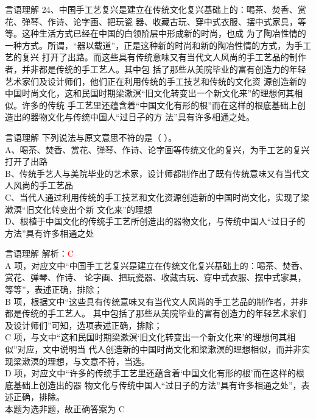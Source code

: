 \documentclass[aspectratio=169]{beamer}
\begin{document}
\begin{frame}[t]{言语理解}
24、中国手工艺复兴是建立在传统文化复兴基础上的：喝茶、焚香、赏花、弹琴、作诗、论字画、把玩瓷
器、收藏古玩、穿中式衣服、摆中式家具，等等。这种生活方式已经在中国的白领阶层中形成新的时尚，也成
为了陶冶性情的一种方式。所谓，“器以载道”，正是这种新的时尚和新的陶冶性情的方式，为手工艺的复兴
打开了出路。而这些具有传统意味又有当代文人风尚的手工艺品的制作者，并非都是传统的手工艺人。其中包
括了那些从美院毕业的富有创造力的年轻艺术家们及设计师们，他们正在利用传统的手工技艺和传统的文化资
源创造新的中国时尚文化，这和民国时期梁漱溟“旧文化转变出一个新文化来”的理想何其相似。许多的传统
手工艺里还蕴含着“中国文化有形的根”而在这样的根底基础上创造出的器物文化与传统中国人“过日子的方
法”具有许多相通之处。\\
\end{frame}


\begin{frame}[t]{言语理解}
下列说法与原文意思不符的是（ ）。\\
A、喝茶、焚香、赏花、弹琴、作诗、论字画等传统文化的复兴，为手工艺的复兴打开了出路\\
B、传统手艺人与美院毕业的艺术家，设计师都制作出了既有传统意味又有当代文人风尚的手工艺品\\
C、当代人通过利用传统的手工技艺和文化资源创造新的中国时尚文化，实现了梁漱溟“旧文化转变出个新
文化来”的理想\\
D、根植于中国文化的传统手工艺所创造出的器物文化，与传统中国人“过日子的方法”具有许多相通之处\\

\end{frame}



\begin{frame}[t]{言语理解}
    解析：\textcolor{red}{C}\\
    A 项，对应文中“中国手工艺复兴是建立在传统文化复兴基础上的：喝茶、焚香、赏花、弹琴、作诗、
论字画、把玩瓷器、收藏古玩、穿中式衣服、摆中式家具，等等”，表述正确，排除；\\
B 项，根据文中“这些具有传统意味又有当代文人风尚的手工艺品的制作者，并非都是传统的手工艺人。
其中包括了那些从美院毕业的富有创造力的年轻艺术家们及设计师们”可知，选项表述正确，排除；\\
C 项，与文中“这和民国时期梁漱溟‘旧文化转变出一个新文化来’的理想何其相似”对应，文中说明当
代人创造新的中国时尚文化和梁漱溟的理想相似，而并非实现梁漱溟的理想，与文意不符，当选。\\
D 项，对应文中“许多的传统手工艺里还蕴含着‘中国文化有形的根’而在这样的根底基础上创造出的器
物文化与传统中国人“过日子的方法”具有许多相通之处”，表述正确，排除。\\
本题为选非题，故正确答案为 C\\
\end{frame}
\end{document}
